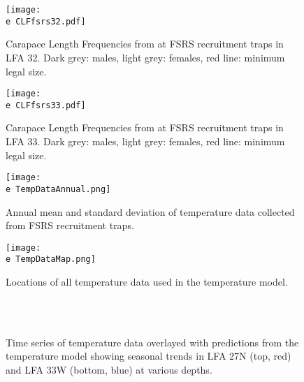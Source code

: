 \documentclass[11pt]{article}
\newcommand{\e}{\string~/bio.data/bio.lobster/figures/LFA2733Framework2018/} %
\begin{document}
    \begin{figure}
    \centering
        \texttt{[image: \\e CLFfsrs32.pdf]}
        \caption{Carapace Length Frequencies from at FSRS recruitment traps in LFA 32. Dark grey: males, light grey: females, red line: minimum legal size.}

    \end{figure}


    \begin{figure}
    \centering
        \texttt{[image: \\e CLFfsrs33.pdf]}
        \caption{Carapace Length Frequencies from at FSRS recruitment traps in LFA 33. Dark grey: males, light grey: females, red line: minimum legal size.}

    \end{figure}




    \begin{figure}
    \centering
        \texttt{[image: \\e TempDataAnnual.png]}
        \caption{Annual mean and standard deviation of temperature data collected from FSRS recruitment traps.}

    \end{figure}

    \begin{figure}
    \centering
        \texttt{[image: \\e TempDataMap.png]}
        \caption{Locations of all temperature data used in the temperature model.}

    \end{figure}

        \begin{figure}
        \centering
                \\
                \\
        
         \caption{Time series of temperature data overlayed with predictions from the temperature model showing seasonal trends in LFA 27N (top, red) and LFA 33W (bottom, blue) at various depths.}
        \end{figure}
\end{document}
